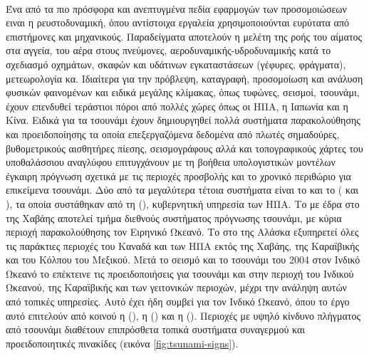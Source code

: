 \paragraph{} Ένα από τα πιο πρόσφορα και ανεπτυγμένα πεδία εφαρμογών των προσομοιώσεων
ειναι η ρευστοδυναμική, όπου αντίστοιχα εργαλεία χρησιμοποιούνται ευρύτατα από επιστήμονες
και μηχανικούς. Παραδείγματα αποτελούν η μελέτη της ροής του αίματος στα αγγεία, του αέρα
στους πνεύμονες, αεροδυναμικής-υδροδυναμικής κατά το σχεδιασμό οχημάτων, σκαφών και
υδάτινων εγκαταστάσεων (γέφυρες, φράγματα), μετεωρολογία κα. Ιδιαίτερα για την πρόβλεψη,
καταγραφή, προσομοίωση και ανάλυση φυσικών φαινομένων και ειδικά μεγάλης κλίμακας, όπως
τυφώνες, σεισμοί, τσουνάμι, έχουν επενδυθεί τεράστιοι πόροι από πολλές χώρες όπως οι ΗΠΑ,
η Ιαπωνία και η Κίνα. Ειδικά για τα τσουνάμι έχουν δημιουργηθεί πολλά συστήματα
παρακολούθησης και προειδοποίησης τα οποία επεξεργαζόμενα δεδομένα από πλωτές σημαδούρες,
βυθομετρικούς αισθητήρες πίεσης, σεισμογράφους αλλά και τοπογραφικούς χάρτες του
υποθαλάσσιου αναγλύφου επιτυγχάνουν με τη βοήθεια υπολογιστικών μοντέλων έγκαιρη πρόγνωση
σχετικά με τις περιοχές προσβολής και το χρονικό περιθώριο για επικείμενα τσουνάμι. Δύο
από τα μεγαλύτερα τέτοια συστήματα είναι το  και το  (
και ), τα οποία συστάθηκαν από τη 
(), κυβερνητική υπηρεσία των ΗΠΑ. Το
 με έδρα στο  της Χαβάης αποτελεί τμήμα διεθνούς συστήματος
πρόγνωσης τσουνάμι, με κύρια περιοχή παρακολούθησης τον Ειρηνικό Ωκεανό. Το  στο
 της Αλάσκα εξυπηρετεί όλες τις παράκτιες περιοχές του Καναδά και των ΗΠΑ
εκτός της Χαβάης, της Καραϊβικής και του Κόλπου του Μεξικού. Μετά το σεισμό και το
τσουνάμι του 2004 στον Ινδικό Ωκεανό το  επέκτεινε τις προειδοποιήσεις για
τσουνάμι και στην περιοχή του Ινδικού Ωκεανού, της Καραϊβικής και των γειτονικών περιοχών,
μέχρι την ανάληψη αυτών από τοπικές υπηρεσίες. Αυτό έχει ήδη συμβεί για τον Ινδικό Ωκεανό,
όπου το έργο αυτό επιτελούν από κοινού η  (), η  () και η  (). Περιοχές με υψηλό κίνδυνο πλήγματος από τσουνάμι διαθέτουν επιπρόσθετα
τοπικά συστήματα συναγερμού και προειδοποιητικές πινακίδες (εικόνα
\ref{fig:tsunami-signs}).

